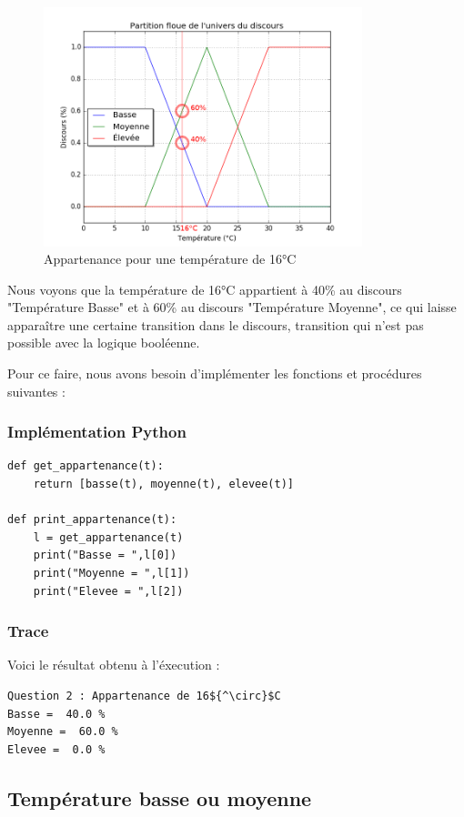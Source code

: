 \documentclass[a4paper]{article}
\begin{document}
\begin{figure}[h]
\begin{center}
	\includegraphics[width=350px]{plot_3_16dC.png}
\end{center}
\caption{Appartenance pour une température de 16°C}
\end{figure}

Nous voyons que la température de 16°C appartient à 40\% au discours "Température Basse" et à 60\% au discours "Température Moyenne", ce qui laisse apparaître une certaine transition dans le discours, transition qui n'est pas possible avec la logique booléenne.

Pour ce faire, nous avons besoin d'implémenter les fonctions et procédures suivantes :

\subsubsection{Implémentation Python}
\begin{lstlisting}
def get_appartenance(t):
    return [basse(t), moyenne(t), elevee(t)]

def print_appartenance(t):
    l = get_appartenance(t)
    print("Basse = ",l[0])
    print("Moyenne = ",l[1])
    print("Elevee = ",l[2])
\end{lstlisting}

\subsubsection{Trace}
Voici le résultat obtenu à l'éxecution :

\begin{lstlisting}[mathescape]
Question 2 : Appartenance de 16${^\circ}$C
Basse =  40.0 %
Moyenne =  60.0 %
Elevee =  0.0 %
\end{lstlisting}

\subsection{Température basse ou moyenne}
\end{document}
